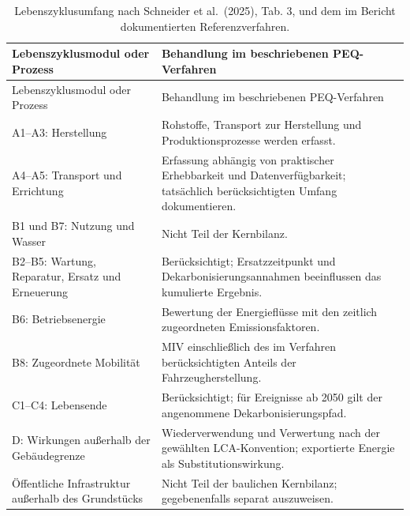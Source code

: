 \documentclass[
  ngerman,
  a4paper,
  DIV=11]{scrreprt}
\begin{document}
\begin{longtable}[]{@{}
  >{\raggedright\arraybackslash}p{}
  >{\raggedright\arraybackslash}p{}@{}}
\caption{Lebenszyklusumfang nach Schneider et al.~(2025), Tab. 3, und
dem im Bericht dokumentierten
Referenzverfahren.}\label{tbl-lca-umfang}\tabularnewline
\toprule\noalign{}
\begin{minipage}[b]{\linewidth}\raggedright
Lebenszyklusmodul oder Prozess
\end{minipage} & \begin{minipage}[b]{\linewidth}\raggedright
Behandlung im beschriebenen PEQ-Verfahren
\end{minipage} \\
\midrule\noalign{}
\endfirsthead
\toprule\noalign{}
\begin{minipage}[b]{\linewidth}\raggedright
Lebenszyklusmodul oder Prozess
\end{minipage} & \begin{minipage}[b]{\linewidth}\raggedright
Behandlung im beschriebenen PEQ-Verfahren
\end{minipage} \\
\midrule\noalign{}
\endhead
\bottomrule\noalign{}
\endlastfoot
A1--A3: Herstellung & Rohstoffe, Transport zur Herstellung und
Produktionsprozesse werden erfasst. \\
A4--A5: Transport und Errichtung & Erfassung abhängig von praktischer
Erhebbarkeit und Datenverfügbarkeit; tatsächlich berücksichtigten Umfang
dokumentieren. \\
B1 und B7: Nutzung und Wasser & Nicht Teil der Kernbilanz. \\
B2--B5: Wartung, Reparatur, Ersatz und Erneuerung & Berücksichtigt;
Ersatzzeitpunkt und Dekarbonisierungsannahmen beeinflussen das
kumulierte Ergebnis. \\
B6: Betriebsenergie & Bewertung der Energieflüsse mit den zeitlich
zugeordneten Emissionsfaktoren. \\
B8: Zugeordnete Mobilität & MIV einschließlich des im Verfahren
berücksichtigten Anteils der Fahrzeugherstellung. \\
C1--C4: Lebensende & Berücksichtigt; für Ereignisse ab 2050 gilt der
angenommene Dekarbonisierungspfad. \\
D: Wirkungen außerhalb der Gebäudegrenze & Wiederverwendung und
Verwertung nach der gewählten LCA-Konvention; exportierte Energie als
Substitutionswirkung. \\
Öffentliche Infrastruktur außerhalb des Grundstücks & Nicht Teil der
baulichen Kernbilanz; gegebenenfalls separat auszuweisen. \\
\end{longtable}
\end{document}
